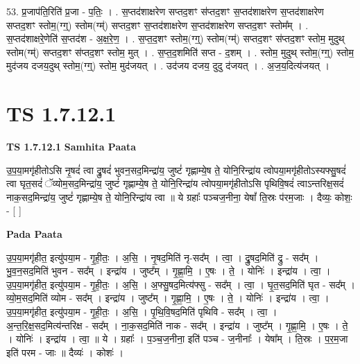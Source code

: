 \documentclass[17pt]{extarticle}
\begin{document}
53. प्र॒जाप॑ति॒रिति॑ प्र॒जा - प॒तिः॒ । . स॒प्तद॑शाक्षरेण सप्तद॒शꣳ स॑प्तद॒शꣳ स॒प्तद॑शाक्षरेण स॒प्तद॑शाक्षरेण सप्तद॒शꣳ स्तोम॒(ग्ग्॒) स्तोम(ग्म्॑) सप्तद॒शꣳ स॒प्तद॑शाक्षरेण स॒प्तद॑शाक्षरेण सप्तद॒शꣳ स्तोम᳚म् । . स॒प्तद॑शाक्षरे॒णेति॑ स॒प्तद॑श - अ॒क्ष॒रे॒ण॒ । . स॒प्त॒द॒शꣳ स्तोम॒(ग्ग्॒) स्तोम(ग्म्॑) सप्तद॒शꣳ स॑प्तद॒शꣳ स्तोम॒ मुदुथ् स्तोम(ग्म्॑) सप्तद॒शꣳ स॑प्तद॒शꣳ स्तोम॒ मुत् । . स॒प्त॒द॒शमिति॑ सप्त - द॒शम् । . स्तोम॒ मुदुथ् स्तोम॒(ग्ग्॒) स्तोम॒ मुद॑जय दजय॒दुथ् स्तोम॒(ग्ग्॒) स्तोम॒ मुद॑जयत् । . उद॑जय दजय॒ दुदु द॑जयत् । . अ॒ज॒य॒दित्य॑जयत् । \newline
\pagebreak
{}

\section{ TS 1.7.12.1 }

\textbf{TS 1.7.12.1 } \newline
\textbf{Samhita Paata} \newline

उ॒प॒या॒मगृ॑हीतोऽसि नृ॒षदं॑ त्वा द्रु॒षदं॑ भुवन॒सद॒मिन्द्रा॑य॒ जुष्टं॑ गृह्णाम्ये॒ष ते॒ योनि॒रिन्द्रा॑य त्वोपया॒मगृ॑हीतोऽस्यफ्सु॒षदं॑ त्वा घृत॒सदं॑ ॅव्योम॒सद॒मिन्द्रा॑य॒ जुष्टं॑ गृह्णाम्ये॒ष ते॒ योनि॒रिन्द्रा॑य त्वोपया॒मगृ॑हीतोऽसि पृथिवि॒षदं॑ त्वाऽन्तरिक्ष॒सदं॑ नाक॒सद॒मिन्द्रा॑य॒ जुष्टं॑ गृह्णाम्ये॒ष ते॒ योनि॒रिन्द्रा॑य त्वा ॥ ये ग्रहाः᳚ पञ्चज॒नीना॒ येषां᳚ ति॒स्रः प॑रम॒जाः । दैव्यः॒ कोशः॒ - [ ] \newline

\textbf{Pada Paata} \newline

उ॒प॒या॒मगृ॑हीत॒ इत्यु॑पया॒म - गृ॒ही॒तः॒ । अ॒सि॒ । नृ॒षद॒मिति॑ नृ-सद᳚म् । त्वा॒ । द्रु॒षद॒मिति॑ द्रु - सद᳚म् । भु॒व॒न॒सद॒मिति॑ भुवन - सद᳚म् । इन्द्रा॑य । जुष्ट᳚म् । गृ॒ह्णा॒मि॒ । ए॒षः । ते॒ । योनिः॑ । इन्द्रा॑य । त्वा॒ । उ॒प॒या॒मगृ॑हीत॒ इत्यु॑पया॒म - गृ॒ही॒तः॒ । अ॒सि॒ । अ॒फ्सु॒षद॒मित्य॑फ्सु - सद᳚म् । त्वा॒ । घृ॒त॒सद॒मिति॑ घृत - सद᳚म् । व्यो॒म॒सद॒मिति॑ व्योम - सद᳚म् । इन्द्रा॑य । जुष्ट᳚म् । गृ॒ह्णा॒मि॒ । ए॒षः । ते॒ । योनिः॑ । इन्द्रा॑य । त्वा॒ । उ॒प॒या॒मगृ॑हीत॒ इत्यु॑पया॒म - गृ॒ही॒तः॒ । अ॒सि॒ । पृ॒थि॒वि॒षद॒मिति॑ पृथिवि - सद᳚म् । त्वा॒ । अ॒न्त॒रि॒क्ष॒सद॒मित्य॑न्तरिक्ष - सद᳚म् । ना॒क॒सद॒मिति॑ नाक - सद᳚म् । इन्द्रा॑य । जुष्ट᳚म् । गृ॒ह्णा॒मि॒ । ए॒षः । ते॒ । योनिः॑ । इन्द्रा॑य । त्वा॒ ॥ ये । ग्रहाः᳚ । प॒ञ्च॒ज॒नीना॒ इति॑ पञ्च - ज॒नीनाः᳚ । येषा᳚म् । ति॒स्रः । प॒र॒म॒जा इति॑ परम - जाः ॥ दैव्यः॑ । कोशः॑ ।  \newline
\end{document}
